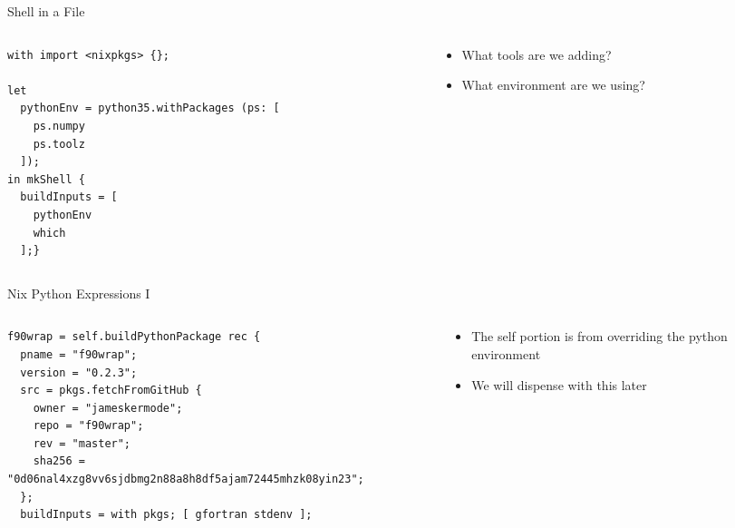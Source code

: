 \documentclass[bigger,unknownkeysallowed,aspectratio=169,red,colorblocks]{beamer}
\begin{document}
\begin{frame}[label={sec:orgabdb45b},fragile]{Shell in a File}
 \begin{columns}
\begin{column}{0.6\columnwidth}
\begin{verbatim}
with import <nixpkgs> {};

let
  pythonEnv = python35.withPackages (ps: [
    ps.numpy
    ps.toolz
  ]);
in mkShell {
  buildInputs = [
    pythonEnv
    which
  ];}
\end{verbatim}
\end{column}
\begin{column}{0.4\columnwidth}
\begin{itemize}
\item What \alert{tools} are we adding?
\item What \alert{environment} are we using?
\end{itemize}
\end{column}
\end{columns}
\end{frame}
\begin{frame}[label={sec:orgf23eadc},fragile]{Nix Python Expressions I}
 \begin{columns}
\begin{column}{0.6\columnwidth}
\begin{verbatim}
f90wrap = self.buildPythonPackage rec {
  pname = "f90wrap";
  version = "0.2.3";
  src = pkgs.fetchFromGitHub {
    owner = "jameskermode";
    repo = "f90wrap";
    rev = "master";
    sha256 = "0d06nal4xzg8vv6sjdbmg2n88a8h8df5ajam72445mhzk08yin23";
  };
  buildInputs = with pkgs; [ gfortran stdenv ];
\end{verbatim}
\end{column}

\begin{column}{0.4\columnwidth}
\begin{itemize}
\item The self portion is from overriding the python environment
\item We will dispense with this later
\end{itemize}
\end{column}
\end{columns}
\end{frame}
\end{document}
